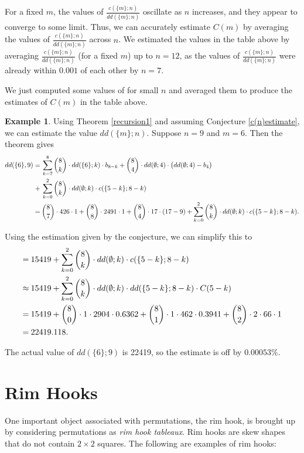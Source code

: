 \documentclass[11pt, a4paper, reqno]{article}
\numberwithin{equation}{section}
\newcommand{\s}{\hspace{0.08cm}}
\theoremstyle{definition}
\newtheorem{example}[theorem]{Example}
\begin{document}
	For a fixed $m$, the values of $\frac{c(\{m\}; n)}{dd(\{m\}; n)}$ oscillate as $n$ increases, and they appear to converge to some limit. Thus, we can accurately estimate $C(m)$ by averaging the values of $\frac{c(\{m\}; n)}{dd(\{m\}; n)}$ across $n$. We estimated the values in the table above by averaging $\frac{c(\{m\}; n)}{dd(\{m\}; n)}$ (for a fixed $m$) up to $n = 12$, as the values of $\frac{c(\{m\}; n)}{dd(\{m\}; n)}$ were already within $0.001$ of each other by $n=7$.
	
	We just computed some values of  for small $n$ and averaged them to produce the estimates of $C(m)$ in the table above.
	
	\begin{example}
		Using Theorem \ref{recursion1} and assuming Conjecture \ref{c(n)estimate}, we can estimate the value $dd(\{m\}; n)$. Suppose $n=9$ and $m=6$. Then the theorem gives 
	 	\begin{align*}
		dd(\{6\}, 9) = & \s \sum_{k=7}^8\dbinom{8}{k}\cdot dd(\{6\}; k)\cdot b_{8-k} + \dbinom{8}{4}\cdot dd(\emptyset;4)\cdot\big(dd(\emptyset;4)-b_4\big)\\
		+ & \s\sum_{k=0}^2\dbinom{8}{k}\cdot dd(\emptyset;k)\cdot c(\{5-k\};8-k) \\ = & \s \dbinom{8}{7}\cdot 426 \cdot 1 + \dbinom{8}{8}\cdot 2491\cdot 1 + \dbinom{8}{4}\cdot17\cdot(17-9) + \sum_{k=0}^2\dbinom{8}{k}\cdot dd(\emptyset;k)\cdot c(\{5-k\};8-k).
		\end{align*}
	\end{example}
	
	Using the estimation given by the conjecture, we can simplify this to
	\begin{align*}
	= & \s 15419 + \sum_{k=0}^2\dbinom{8}{k}\cdot dd(\emptyset;k)\cdot c(\{5-k\};8-k) \\ \approx &\s 15419 + \sum_{k=0}^2\dbinom{8}{k}\cdot dd(\emptyset;k)\cdot dd(\{5-k\}; 8-k) \cdot C(5-k) \\ = & \s 15419 + \dbinom{8}{0} \cdot 1 \cdot 2904 \cdot 0.6362 + \dbinom{8}{1} \cdot 1 \cdot 462 \cdot 0.3941 + \dbinom{8}{2} \cdot 2 \cdot 66 \cdot 1 \\ = & \s 22419.118.
	\end{align*}
	
	The actual value of $dd(\{6\}; 9)$ is 22419, so the estimate is off by $0.00053\%$. 
	
	\section{Rim Hooks}\label{rimhooks}
	 One important object associated with permutations, the rim hook, is brought up by considering permutations as \textit{rim hook tableaux}. Rim hooks are skew shapes that do not contain $2 \times 2$ squares. The following are examples of rim hooks:
	\vspace{0.3cm}
	\begin{center}
	     \hspace{1cm}  \hspace{1cm}
	 \hspace{1cm} 
	\end{center}
	\vspace{0.3cm}
	
\end{document}

